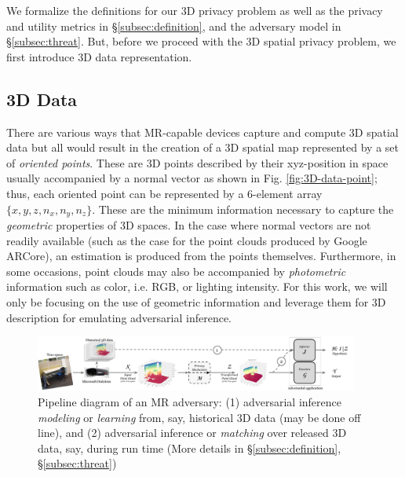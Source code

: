 We formalize the definitions for our 3D privacy problem as well as the privacy and utility metrics in \S\ref{subsec:definition}, and the adversary model in \S\ref{subsec:threat}. But, before we proceed with the 3D spatial privacy problem, we first introduce 3D data representation.

\subsection{3D Data}\label{subsec:3d-data}
There are various ways that MR-capable devices capture and compute 3D spatial data but all would result in the creation of a 3D spatial map represented by a set of \textit{oriented points}. These are 3D points described by their xyz-position in space usually accompanied by a normal vector as shown in Fig. \ref{fig:3D-data-point}; thus, each oriented point can be represented by a 6-element array $\{x, y, z, n_x, n_y, n_z\}$. These are the minimum information necessary to capture the \textit{geometric} properties of 3D spaces. In the case where normal vectors are not readily available (such as the case for the point clouds produced by Google ARCore), an estimation is produced from the points themselves. Furthermore, in some occasions, point clouds may also be accompanied by \textit{photometric} information such as color, i.e. RGB, or lighting intensity. For this work, we will only be focusing on the use of geometric information and leverage them for 3D description for emulating adversarial inference.

\begin{figure}[t]
	\centering
	\vspace{-2mm}
	\includegraphics[width=0.95\textwidth]{figures/adversary-model-pipeline-v2.pdf}%
	\vspace{-2mm}
	\caption{Pipeline diagram of an MR adversary: {\small (1) adversarial inference \textit{modeling} or \textit{learning} from, say, historical 3D data (may be done off line), and (2) adversarial inference or \textit{matching} over released 3D data, say, during run time (More details in \S\ref{subsec:definition}, \S\ref{subsec:threat})}}
	\vspace{-2mm}
	\label{fig:adversary-model-pipeline}
\end{figure}

